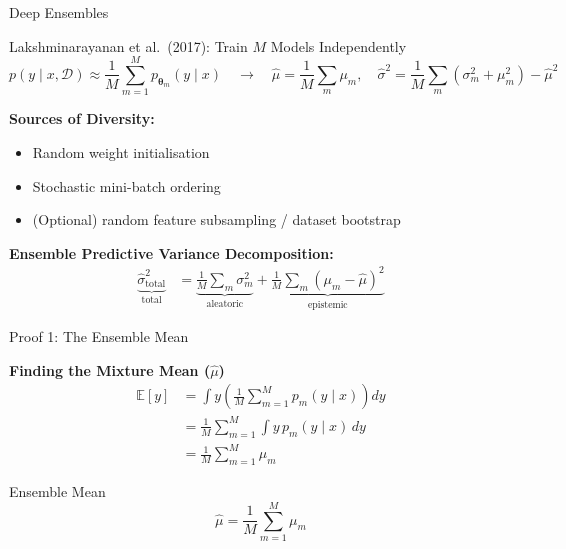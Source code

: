 \documentclass[aspectratio=169]{beamer}
\newcommand{\calD}{\mathcal{D}}
\newcommand{\btheta}{\bm{\theta}}
\begin{document}
\begin{frame}{Deep Ensembles}

  \begin{block}{Lakshminarayanan et al.\ (2017): Train $M$ Models Independently}
    \[
      p(y \mid x, \calD) \approx \frac{1}{M}\sum_{m=1}^M p_{\btheta_m}(y \mid x)
      \quad\longrightarrow\quad
      \hat\mu = \frac{1}{M}\sum_m \mu_m, \quad
      \hat\sigma^2 = \frac{1}{M}\sum_m \!\left(\sigma_m^2 + \mu_m^2\right) - \hat\mu^2
    \]
  \end{block}


  \textbf{Sources of Diversity:}
  \begin{itemize}
    \item Random weight initialisation
    \item Stochastic mini-batch ordering
    \item (Optional) random feature subsampling / dataset bootstrap
  \end{itemize}

  \textbf{Ensemble Predictive Variance Decomposition:}
  \begin{align*}
    \underbrace{\hat\sigma^2_{\text{total}}}_{\text{total}}
    &= \underbrace{\frac{1}{M}\sum_m\sigma_m^2}_{\text{aleatoric}}
      + \underbrace{\frac{1}{M}\sum_m(\mu_m - \hat\mu)^2}_{\text{epistemic}}
  \end{align*}


\end{frame}
\begin{frame}{Proof 1: The Ensemble Mean}

  \textbf{Finding the Mixture Mean ($\hat{\mu}$)} 
  \begin{align*}
    \mathbb{E}[y] &= \int y \left( \frac{1}{M} \sum_{m=1}^M p_m(y \mid x) \right) dy \\[1ex]
    &= \frac{1}{M} \sum_{m=1}^M \int y \, p_m(y \mid x) \, dy \\[1ex]
    &= \frac{1}{M} \sum_{m=1}^M \mu_m 
  \end{align*}

  \begin{block}{Ensemble Mean}
    \[ \hat{\mu} = \frac{1}{M} \sum_{m=1}^M \mu_m \]
  \end{block}
\end{frame}
\end{document}

